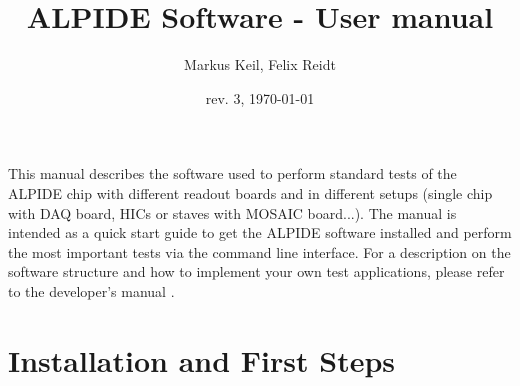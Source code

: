 \documentclass{article}
\begin{document}
\title{ALPIDE Software - User manual}
\date{rev. 3, \today}
\author{Markus Keil, Felix Reidt}
\maketitle

This manual describes the software used to perform standard tests of the ALPIDE chip with different readout boards and in different setups (single chip with DAQ board, HICs or staves with MOSAIC board...).
The manual is intended as a quick start guide to get the ALPIDE
software installed and perform the most important tests via the
command line interface. For a description on the software structure and how to implement your own test applications, please refer to the developer's manual .


\section {Installation and First Steps}
\end{document}
